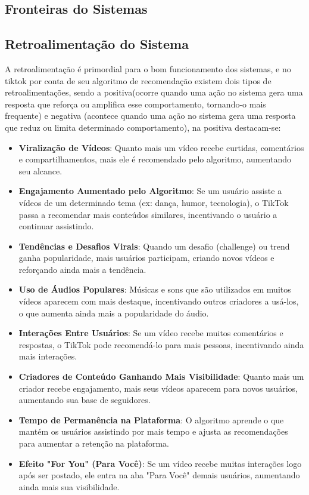 \newpage
\subsection{Fronteiras do Sistemas}





\subsection{Retroalimentação do Sistema}

A  retroalimentação é primordial para o bom funcionamento dos sistemas, e no tiktok  por conta de seu algoritmo de recomendação existem dois tipos de retroalimentações, sendo a positiva(ocorre quando uma ação no sistema gera uma resposta que reforça ou amplifica esse comportamento, tornando-o mais frequente) e negativa (acontece quando uma ação no sistema gera uma resposta que reduz ou limita determinado comportamento), na positiva destacam-se:

\begin{itemize}
 \item \textbf{Viralização de Vídeos}: Quanto mais um vídeo recebe curtidas, comentários e compartilhamentos, mais ele é recomendado pelo algoritmo, aumentando seu alcance.
\item \textbf{Engajamento Aumentado pelo Algoritmo}: Se um usuário assiste a vídeos de um determinado tema (ex: dança, humor, tecnologia), o TikTok passa a recomendar mais conteúdos similares, incentivando o usuário a continuar assistindo.
\item \textbf{Tendências e Desafios Virais}: Quando um desafio (challenge) ou trend ganha popularidade, mais usuários participam, criando novos vídeos e reforçando ainda mais a tendência.
\item \textbf{Uso de Áudios Populares}: Músicas e sons que são utilizados em muitos vídeos aparecem com mais destaque, incentivando outros criadores a usá-los, o que aumenta ainda mais a popularidade do áudio.
\item \textbf{Interações Entre Usuários}: Se um vídeo recebe muitos comentários e respostas, o TikTok pode recomendá-lo para mais pessoas, incentivando ainda mais interações.
\item \textbf{Criadores de Conteúdo Ganhando Mais Visibilidade}: Quanto mais um criador recebe engajamento, mais seus vídeos aparecem para novos usuários, aumentando sua base de seguidores.
\item \textbf{Tempo de Permanência na Plataforma}:
O algoritmo aprende o que mantém os usuários assistindo por mais tempo e ajusta as recomendações para aumentar a retenção na plataforma.
\item \textbf{Efeito "For You" (Para Você)}:
Se um vídeo recebe muitas interações logo após ser postado, ele entra na aba "Para Você" demais usuários, aumentando ainda mais sua visibilidade.
\end{itemize}



